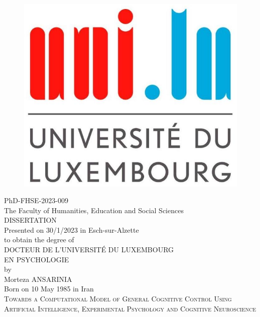 \thispagestyle{empty}


\begin {center}
\begin{figure}
    \centering
    \includegraphics[width=0.2\columnwidth]{resources/logo_uni.jpg}
\end{figure}

{\footnotesize{PhD-FHSE-2023-009}}\\
{\footnotesize{The Faculty of Humanities, Education and Social Sciences}}\\
\vspace{1.5cm}
\large{DISSERTATION}\\
\vspace{0.2cm}
Presented on 30/1/2023 in Esch-sur-Alzette\\
\vspace{0.2cm}
to obtain the degree of\\
\vspace{1cm}
\textsc{\Large{DOCTEUR DE L'UNIVERSITÉ DU LUXEMBOURG}}\\
\vspace{0.3cm}
\textsc{\Large{EN PSYCHOLOGIE}}\\
\vspace{0.3cm}
by\\
\vspace{0.3cm}
{\Large Morteza ANSARINIA}\\[-10pt]
{\footnotesize Born on 10 May 1985 in Iran}\\
\vspace{1.cm}
{\Large \scshape Towards a Computational Model of General Cognitive Control Using Artificial Intelligence, Experimental Psychology and Cognitive Neuroscience}


\end {center}

\newpage
\restoregeometry


